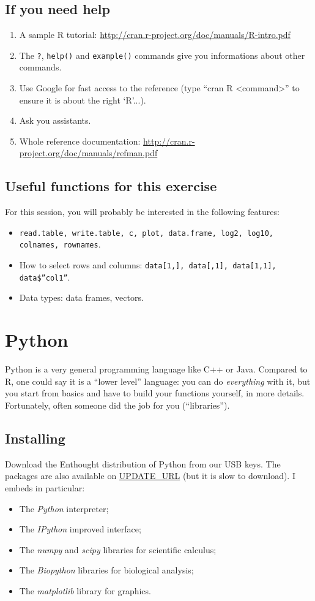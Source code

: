 \documentclass[a4paper,11pt]{article}
\begin{document}
\subsection{If you need help}
\begin{enumerate}
\item A sample R tutorial: \url{http://cran.r-project.org/doc/manuals/R-intro.pdf}
\item The \texttt{?}, \texttt{help()} and \texttt{example()} commands give you informations about other commands.
\item Use Google for fast access to the reference (type ``cran R <command>'' to ensure it is about the right `R'...).
\item Ask you assistants.
\item Whole reference documentation: \url{http://cran.r-project.org/doc/manuals/refman.pdf}
\end{enumerate}

\subsection{Useful functions for this exercise}
For this session, you will probably be interested in the following features:
\begin{itemize}
\item \texttt{read.table, write.table, c, plot, data.frame, log2, log10, colnames, rownames}.
\item How to select rows and columns: \texttt{data[1,], data[,1], data[1,1], data\$''col1''}.
\item Data types: data frames, vectors.
\end{itemize}

\clearpage

\section{Python}

Python is a very general programming language like C++ or Java. Compared to R, one could say it is a ``lower level'' language:
you can do {\it everything} with it, but you start from basics and have to build your functions yourself, in more details.
Fortunately, often someone did the job for you (``libraries'').

\subsection{Installing}
Download the Enthought distribution of Python from our USB keys. The packages are also available on \url{UPDATE_URL} 
(but it is slow to download). I embeds in particular:
\begin{itemize}
\item The {\it Python} interpreter;
\item The {\it IPython} improved interface;
\item The {\it numpy} and {\it scipy} libraries for scientific calculus;
\item The {\it Biopython} libraries for biological analysis;
\item The {\it matplotlib} library for graphics.
\end{itemize}
\end{document}

